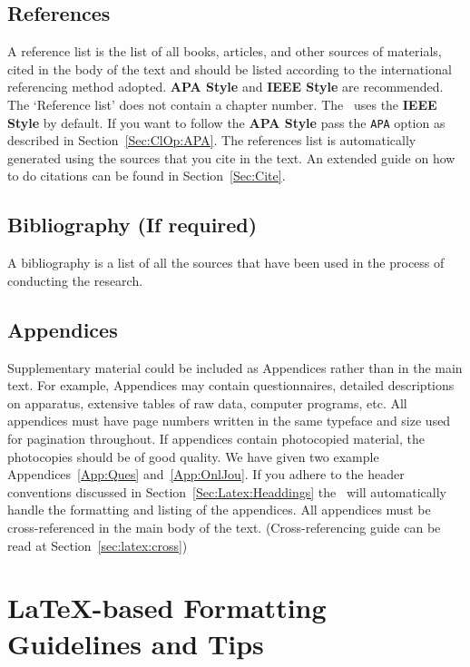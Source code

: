 \documentclass[12pt]{uomthesis}
\begin{document}
\section{References}
A reference list is the list of all books, articles, and other sources of materials, cited in the body of the text and should be listed according to the international referencing method adopted. \textbf{APA Style} and \textbf{IEEE Style} are recommended. The ‘Reference list’ does not contain a chapter number. The~\TheClass{} uses the \textbf{IEEE Style} by default. If you want to follow the \textbf{APA Style} pass the \texttt{APA} option as described in Section~\ref{Sec:ClOp:APA}. The references list is automatically generated using the sources that you cite in the text. An extended guide on how to do citations can be found in Section~\ref{Sec:Cite}.



\section{Bibliography (If required)}
A bibliography is a list of all the sources that have been used in the process of conducting the research.


\section{Appendices}
\label{sec:comp:appen}
Supplementary material could be included as Appendices rather than in the main text. For example, Appendices may contain questionnaires, detailed descriptions on apparatus, extensive tables of raw data, computer programs, etc. All appendices must have page numbers written in the same typeface and size used for pagination throughout. If appendices contain photocopied material, the photocopies should be of good quality. We have given two example Appendices~\ref{App:Ques} and~\ref{App:OnlJou}. If you adhere to the header conventions discussed in Section~\ref{Sec:Latex:Headdings} the~\TheClass{} will automatically handle the formatting and listing of the appendices. All appendices must be cross-referenced in the main body of the text. (Cross-referencing guide can be read at Section~\ref{sec:latex:cross})



\chapter{\LaTeX-based Formatting Guidelines and Tips}
\label{ch:latex}
\end{document}
